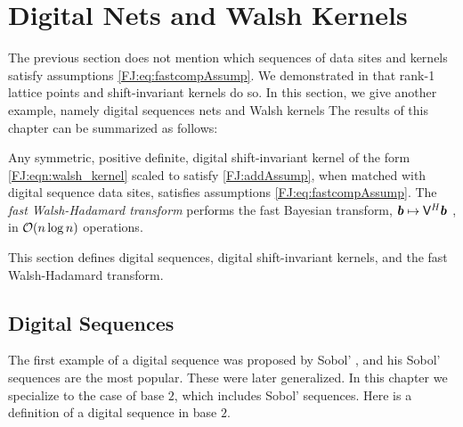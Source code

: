 \documentclass[graybox,footinfo]{svmult}
\begin{document}



\section{Digital Nets and Walsh Kernels}
\label{FJ:sec:sobol_walsh}


The previous section does not mention which sequences of data sites and  kernels satisfy assumptions \eqref{FJ:eq:fastcompAssump}.  We demonstrated in \cite{RatHic19a} that rank-1 lattice points and shift-invariant kernels do so.  In this section, we give another example, namely 
digital sequences nets and Walsh kernels
The results of this chapter can be summarized as follows:



\begin{theorem}
	Any symmetric, positive definite, digital shift-invariant kernel of the form \eqref{FJ:eqn:walsh_kernel} scaled to satisfy \eqref{FJ:addAssump}, when matched with digital sequence data sites, satisfies assumptions \eqref{FJ:eq:fastcompAssump}.  The \emph{fast Walsh-Hadamard transform} performs the fast Bayesian transform,  ${\boldsymbol{b}} \mapsto \mathsf{V}^H {\boldsymbol{b}}$ , in ${\mathcal{O}}(n \log n)$ operations.
\end{theorem}
This section defines digital sequences, digital shift-invariant kernels, and the fast Walsh-Hadamard transform.

\subsection{Digital Sequences} \label{FJ:sec:sobol}

The first example of a digital sequence was proposed by Sobol' \cite{Sob67}, and his Sobol' sequences are the most popular.  These were later generalized.  In this chapter we specialize to the case of base $2$, which includes Sobol' sequences.  Here is a definition of a digital sequence in base $2$.
\end{document}
